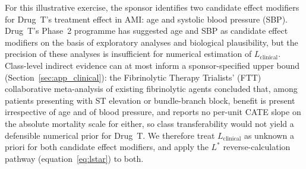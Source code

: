 \documentclass[AMA,Times1COL]{WileyNJDv5}
\begin{document}
For this illustrative exercise, the sponsor identifies two candidate effect modifiers for Drug~T's treatment effect in AMI: age and systolic blood pressure (SBP). Drug~T's Phase~2 programme has suggested age and SBP as candidate effect modifiers on the basis of exploratory analyses and biological plausibility, but the precision of these analyses is insufficient for numerical estimation of $L_{\text{clinical}}$. Class-level indirect evidence can at most inform a sponsor-specified upper bound (Section~\ref{sec:app_clinical}): the Fibrinolytic Therapy Trialists' (FTT) collaborative meta-analysis of existing fibrinolytic agents\cite{ftt1994} concluded that, among patients presenting with ST elevation or bundle-branch block, benefit is present irrespective of age and of blood pressure, and reports no per-unit CATE slope on the absolute mortality scale for either, so class transferability would not yield a defensible numerical prior for Drug~T.
We therefore treat $L_{\text{clinical}}$ as unknown a priori for both candidate effect modifiers, and apply the $L^*$ reverse-calculation pathway (equation~\ref{eq:lstar}) to both.
\end{document}
